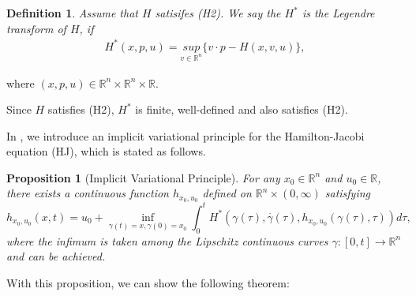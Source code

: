 \documentclass[preprint]{elsarticle}
\newtheorem{proposition}{Proposition}[section]
\newtheorem{definition}{Definition}[section]
\numberwithin{equation}{section}
\begin{document}
\begin{definition}
    Assume that $H$ satisifes (H2). We say the $H^*$ is the Legendre transform of $H$, if
        \begin{align*}
            H^*(x,p,u)= \underset{v \in \mathbb R^n}{sup} \{v\cdot p- H(x,v,u)\},
        \end{align*}
\end{definition}
where $(x,p,u) \in \mathbb R^n \times \mathbb R^n \times \mathbb R$.

Since $H$ satisfies (H2), $H^*$ is finite, well-defined and also satisfies (H2).

In \cite{KLJ2}, we introduce an implicit variational principle for the Hamilton-Jacobi equation (HJ), which is stated as follows.
\begin{proposition}[Implicit Variational Principle]
    For any $x_0 \in \mathbb R^n$ and $u_0 \in \mathbb R$, there exists a continuous function $h_{x_0,u_0}$ defined on $\mathbb R^n \times (0,\infty)$ satisfying
        \begin{equation}
            h_{x_0,u_0}(x,t)= u_0 + \underset{\gamma (t)=x, \gamma (0)=x_0}{\inf} \int ^t _0 H^*(\gamma (\tau), \overset{\cdot}{\gamma }(\tau), h_{x_0,u_0}(\gamma (\tau),\tau)) d\tau ,\label{picard}
        \end{equation}
    where the infimum is taken among the Lipschitz continuous curves $\gamma:[0,t] \rightarrow \mathbb R^n $ and can be achieved.\label{IVP}
\end{proposition}

With this proposition, we can show the following theorem:
\end{document}
